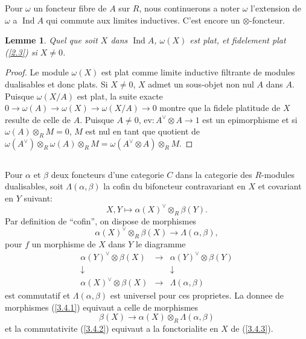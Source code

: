 \documentclass[11pt,a4paper]{article}
\theoremstyle{plain}
\newtheorem{lemma}[theorem]{Lemme}
\theoremstyle{definition}
\DeclareMathOperator{\Ind}{Ind}
\newcommand{\ev}{\mathrm{ev}}
\begin{document}
Pour $\omega$ un foncteur fibre de $A$ sur $R$, nous continuerons a noter $\omega$ l'extension de $\omega$ a $\Ind A$ qui commute aux limites inductives. C'est encore un $\otimes$-foncteur.

\begin{lemma}\label{3.3}
Quel que soit $X$ dans $\Ind A$, $\omega(X)$ est plat, et fidelement plat (\ref{2.3}) si $X\neq0$.
\end{lemma}

\begin{proof}
Le module $\omega(X)$ est plat comme limite inductive filtrante de modules dualisables et donc plats. Si $X\neq0$, $X$ admet un sous-objet non nul $A$ dans $A$. Puisque $\omega(X/A)$ est plat, la suite exacte $0\to\omega(A)\to\omega(X)\to\omega(X/A)\to0$ montre que la fidele platitude de $X$ resulte de celle de $A$. Puisque $A\neq0$, $\ev:A^\vee\otimes A\to1$ est un epimorphisme et si $\omega(A)\otimes_R M=0$, $M$ est nul en tant que quotient de $\omega(A^\vee)\otimes_R\omega(A)\otimes_R M=\omega(A^\vee\otimes A)\otimes_R M$.
\end{proof}

\subsection{}\label{3.4}

Pour $\alpha$ et $\beta$ deux foncteurs d'une categorie $C$ dans la categorie des $R$-modules dualisables, soit $\Lambda(\alpha,\beta)$ la cofin du bifoncteur contravariant en $X$ et covariant en $Y$ suivant:
\[
X,Y\mapsto\alpha(X)^\vee\otimes_R\beta(Y).
\]
Par definition de ``cofin'', on dispose de morphismes
\begin{equation}\label{3.4.1}
\alpha(X)^\vee\otimes_R\beta(X)\to\Lambda(\alpha,\beta),
\end{equation}
pour $f$ un morphisme de $X$ dans $Y$ le diagramme
\begin{equation}\label{3.4.2}
\begin{matrix}
\alpha(Y)^\vee\otimes\beta(X) & \longrightarrow & \alpha(Y)^\vee\otimes\beta(Y)\\
\downarrow & & \downarrow\\
\alpha(X)^\vee\otimes\beta(X) & \longrightarrow & \Lambda(\alpha,\beta)
\end{matrix}
\end{equation}
est commutatif et $\Lambda(\alpha,\beta)$ est universel pour ces proprietes. La donnee de morphismes (\ref{3.4.1}) equivaut a celle de morphismes
\begin{equation}\label{3.4.3}
\beta(X)\to\alpha(X)\otimes_R\Lambda(\alpha,\beta)
\end{equation}
et la commutativite (\ref{3.4.2}) equivaut a la fonctorialite en $X$ de (\ref{3.4.3}).
\end{document}
